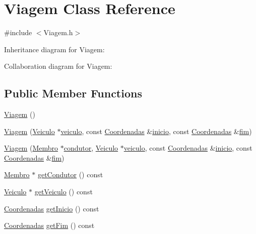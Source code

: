 \hypertarget{class_viagem}{\section{Viagem Class Reference}
\label{class_viagem}
}


{\ttfamily \#include $<$Viagem.\+h$>$}



Inheritance diagram for Viagem\+:


Collaboration diagram for Viagem\+:
\subsection*{Public Member Functions}
\begin{DoxyCompactItemize}
\item 
\hyperlink{class_viagem_a5b74d4780b008414c2045f5788b6afa5}{Viagem} ()
\item 
\hyperlink{class_viagem_a5ba9d09f2be9e317a906865c7c7cff7c}{Viagem} (\hyperlink{class_veiculo}{Veiculo} $\ast$\hyperlink{class_viagem_aee9386a44de6b6afb11faff59331f7b5}{veiculo}, const \hyperlink{class_coordenadas}{Coordenadas} \&\hyperlink{class_viagem_a0a871b6782ab9b478a530f2c15dc1e32}{inicio}, const \hyperlink{class_coordenadas}{Coordenadas} \&\hyperlink{class_viagem_ab54e61d41be0157f9e75b14c8e06137f}{fim})
\item 
\hyperlink{class_viagem_a78e5ed89a44c413db824eeed29632477}{Viagem} (\hyperlink{class_membro}{Membro} $\ast$\hyperlink{class_viagem_a015bb952a7afce6a348d0a9f88bdaf5c}{condutor}, \hyperlink{class_veiculo}{Veiculo} $\ast$\hyperlink{class_viagem_aee9386a44de6b6afb11faff59331f7b5}{veiculo}, const \hyperlink{class_coordenadas}{Coordenadas} \&\hyperlink{class_viagem_a0a871b6782ab9b478a530f2c15dc1e32}{inicio}, const \hyperlink{class_coordenadas}{Coordenadas} \&\hyperlink{class_viagem_ab54e61d41be0157f9e75b14c8e06137f}{fim})
\item 
\hyperlink{class_membro}{Membro} $\ast$ \hyperlink{class_viagem_afbebb365ee675f8177e338fee8b2c749}{get\+Condutor} () const 
\item 
\hyperlink{class_veiculo}{Veiculo} $\ast$ \hyperlink{class_viagem_aed5fab32c45b04991b7a04cd83e2a72d}{get\+Veiculo} () const 
\item 
\hyperlink{class_coordenadas}{Coordenadas} \hyperlink{class_viagem_a9fc0473efd849f4d221cb94789f90c53}{get\+Inicio} () const 
\item 
\hyperlink{class_coordenadas}{Coordenadas} \hyperlink{class_viagem_a8880fb61234fcbf1324201cb634932a5}{get\+Fim} () const 

\end{DoxyCompactItemize}
